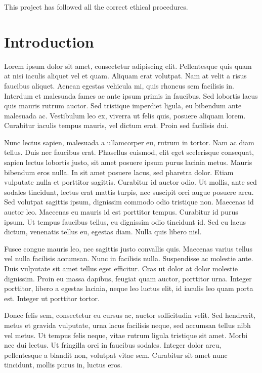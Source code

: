 \documentclass{UoYCSproject}
\begin{document}
\begin{ethics}
This project has followed all the correct ethical procedures.
\end{ethics}

\chapter{Introduction}
\label{cha:Introduction}
Lorem ipsum dolor sit amet, consectetur adipiscing elit. Pellentesque quis quam at nisi iaculis aliquet vel et quam. Aliquam erat volutpat. Nam at velit a risus faucibus aliquet. Aenean egestas vehicula mi, quis rhoncus sem facilisis in. Interdum et malesuada fames ac ante ipsum primis in faucibus. Sed lobortis lacus quis mauris rutrum auctor. Sed tristique imperdiet ligula, eu bibendum ante malesuada ac. Vestibulum leo ex, viverra ut felis quis, posuere aliquam lorem. Curabitur iaculis tempus mauris, vel dictum erat. Proin sed facilisis dui.

Nunc lectus sapien, malesuada a ullamcorper eu, rutrum in tortor. Nam ac diam tellus. Duis nec faucibus erat. Phasellus euismod, elit eget scelerisque consequat, sapien lectus lobortis justo, sit amet posuere ipsum purus lacinia metus. Mauris bibendum eros nulla. In sit amet posuere lacus, sed pharetra dolor. Etiam vulputate nulla et porttitor sagittis. Curabitur id auctor odio. Ut mollis, ante sed sodales tincidunt, lectus erat mattis turpis, nec suscipit orci augue posuere arcu. Sed volutpat sagittis ipsum, dignissim commodo odio tristique non. Maecenas id auctor leo. Maecenas eu mauris id est porttitor tempus. Curabitur id purus ipsum. Ut tempus faucibus tellus, eu dignissim odio tincidunt id. Sed eu lacus dictum, venenatis tellus eu, egestas diam. Nulla quis libero nisl.

Fusce congue mauris leo, nec sagittis justo convallis quis. Maecenas varius tellus vel nulla facilisis accumsan. Nunc in facilisis nulla. Suspendisse ac molestie ante. Duis vulputate sit amet tellus eget efficitur. Cras ut dolor at dolor molestie dignissim. Proin eu massa dapibus, feugiat quam auctor, porttitor urna. Integer porttitor, libero a egestas lacinia, neque leo luctus elit, id iaculis leo quam porta est. Integer ut porttitor tortor.

Donec felis sem, consectetur eu cursus ac, auctor sollicitudin velit. Sed hendrerit, metus et gravida vulputate, urna lacus facilisis neque, sed accumsan tellus nibh vel metus. Ut tempus felis neque, vitae rutrum ligula tristique sit amet. Morbi nec dui lectus. Ut fringilla orci in faucibus sodales. Integer dolor arcu, pellentesque a blandit non, volutpat vitae sem. Curabitur sit amet nunc tincidunt, mollis purus in, luctus eros.
\end{document}
